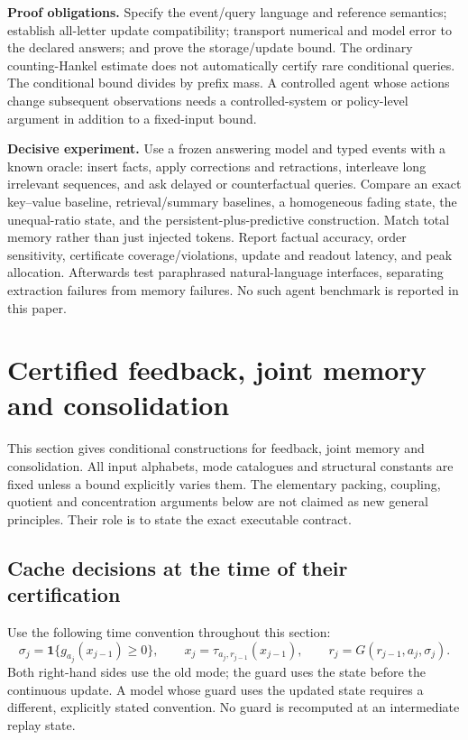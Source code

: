 \textbf{Proof obligations.} Specify the event/query language and reference
semantics; establish all-letter update compatibility; transport numerical and
model error to the declared answers; and prove the storage/update bound.
The ordinary counting-Hankel estimate does not automatically certify rare
conditional queries. The conditional bound divides by prefix mass.
A controlled agent whose actions change subsequent observations needs a
controlled-system or policy-level argument in addition to a fixed-input bound.

\textbf{Decisive experiment.} Use a frozen answering model and typed events
with a known oracle: insert facts, apply corrections and retractions, interleave
long irrelevant sequences, and ask delayed or counterfactual queries. Compare
an exact key--value baseline, retrieval/summary baselines, a homogeneous fading
state, the unequal-ratio state, and the persistent-plus-predictive construction.
Match total memory rather than just injected tokens. Report factual accuracy,
order sensitivity, certificate coverage/violations, update and readout latency,
and peak allocation. Afterwards test paraphrased natural-language interfaces,
separating extraction failures from memory failures. No such agent benchmark
is reported in this paper.

\section{Certified feedback, joint memory and consolidation}
\label{III:M:sec:agent-extensions}
This section gives conditional constructions for feedback, joint memory
and consolidation. All input alphabets, mode catalogues and structural constants
are fixed unless a bound explicitly varies them. The elementary packing,
coupling, quotient and concentration arguments below are not claimed as
new general principles. Their role is to state the exact executable contract.

\subsection{Cache decisions at the time of their certification}
Use the following time convention throughout this section:
\begin{equation}\label{III:M:eq:feedback-time}
 \sigma_j=\mathbf1\{g_{a_j}(x_{j-1})\ge0\},\qquad
 x_j=\tau_{a_j,r_{j-1}}(x_{j-1}),\qquad
 r_j=G(r_{j-1},a_j,\sigma_j).
\end{equation}
Both right-hand sides use the old mode; the guard uses the state before
the continuous update. A model whose guard uses the updated state requires
a different, explicitly stated convention. No guard is recomputed at an
intermediate replay state.

